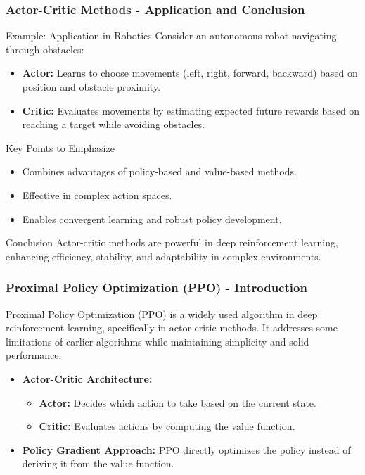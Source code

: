 \documentclass[aspectratio=169]{beamer}
\begin{document}
\begin{frame}[fragile]
    \frametitle{Actor-Critic Methods - Application and Conclusion}
    \begin{block}{Example: Application in Robotics}
        Consider an autonomous robot navigating through obstacles:
        \begin{itemize}
            \item \textbf{Actor:} Learns to choose movements (left, right, forward, backward) based on position and obstacle proximity.
            \item \textbf{Critic:} Evaluates movements by estimating expected future rewards based on reaching a target while avoiding obstacles.
        \end{itemize}
    \end{block}
    
    \begin{block}{Key Points to Emphasize}
        \begin{itemize}
            \item Combines advantages of policy-based and value-based methods.
            \item Effective in complex action spaces.
            \item Enables convergent learning and robust policy development.
        \end{itemize}
    \end{block}

    \begin{block}{Conclusion}
        Actor-critic methods are powerful in deep reinforcement learning, enhancing efficiency, stability, and adaptability in complex environments.
    \end{block}
\end{frame}

\begin{frame}[fragile]
  \frametitle{Proximal Policy Optimization (PPO) - Introduction}
  Proximal Policy Optimization (PPO) is a widely used algorithm in deep reinforcement learning, specifically in actor-critic methods. 
  It addresses some limitations of earlier algorithms while maintaining simplicity and solid performance.

  \begin{itemize}
    \item \textbf{Actor-Critic Architecture:}
      \begin{itemize}
        \item \textbf{Actor:} Decides which action to take based on the current state.
        \item \textbf{Critic:} Evaluates actions by computing the value function.
      \end{itemize}
    
    \item \textbf{Policy Gradient Approach:} 
      PPO directly optimizes the policy instead of deriving it from the value function.
  \end{itemize}
\end{frame}
\end{document}
